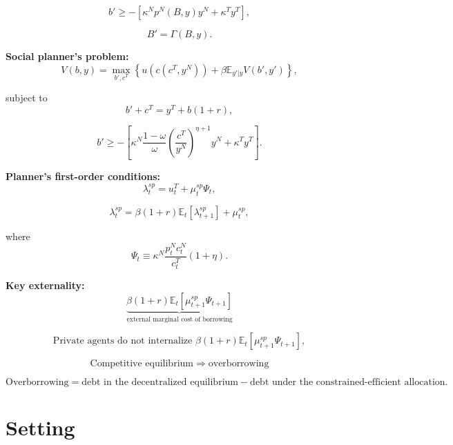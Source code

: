 \documentclass[11pt]{article}
\begin{document}
\[
b'
\geq
-\left[
\kappa^N p^N(B,y)y^N
+
\kappa^T y^T
\right],
\]

\[
B'=\Gamma(B,y).
\]

\textbf{Social planner's problem:}
\[
V(b,y)
=
\max_{b',c^T}
\left\{
u(c(c^T,y^N))
+
\beta\mathbb{E}_{y'|y}V(b',y')
\right\},
\]

subject to
\[
b'+c^T=y^T+b(1+r),
\]

\[
b'
\geq
-\left[
\kappa^N
\frac{1-\omega}{\omega}
\left(
\frac{c^T}{y^N}
\right)^{\eta+1}
y^N
+
\kappa^T y^T
\right].
\]

\textbf{Planner's first-order conditions:}
\[
\lambda_t^{sp}
=
u_t^T
+
\mu_t^{sp}\Psi_t,
\]

\[
\lambda_t^{sp}
=
\beta(1+r)
\mathbb{E}_t[\lambda_{t+1}^{sp}]
+
\mu_t^{sp},
\]

where
\[
\Psi_t
\equiv
\kappa^N
\frac{p_t^N c_t^N}{c_t^T}
(1+\eta).
\]

\textbf{Key externality:}
\[
\underbrace{
\beta(1+r)
\mathbb{E}_t
\left[
\mu_{t+1}^{sp}\Psi_{t+1}
\right]
}_{\text{external marginal cost of borrowing}}
\]

\[
\text{Private agents do not internalize }
\beta(1+r)
\mathbb{E}_t
\left[
\mu_{t+1}^{sp}\Psi_{t+1}
\right],
\]

\[
\boxed{
\text{Competitive equilibrium}
\;\Rightarrow\;
\text{overborrowing}
}
\]

\[
\boxed{
\text{Overborrowing}
=
\text{debt in the decentralized equilibrium}
-
\text{debt under the constrained-efficient allocation}.
}
\]

\newpage



\section{Setting}
\end{document}
